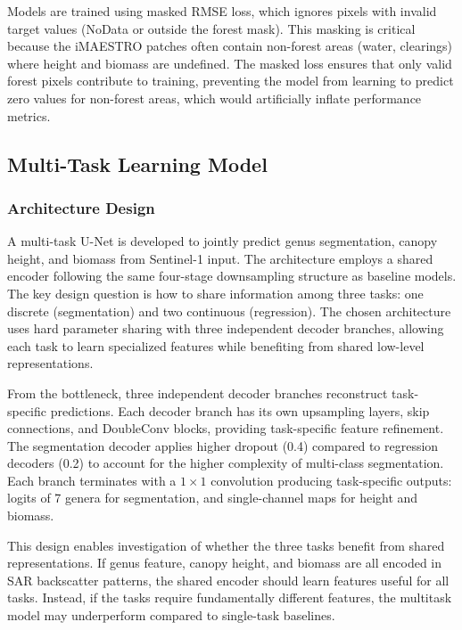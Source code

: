 Models are trained using masked RMSE loss, which ignores pixels with invalid target values (NoData or outside the forest mask). This masking is critical because the iMAESTRO patches often contain non-forest areas (water, clearings) where height and biomass are undefined. The masked loss ensures that only valid forest pixels contribute to training, preventing the model from learning to predict zero values for non-forest areas, which would artificially inflate performance metrics.

\subsection{Multi-Task Learning Model}

\subsubsection{Architecture Design}

A multi-task U-Net is developed to jointly predict genus segmentation, canopy height, and biomass from Sentinel-1 input. The architecture employs a shared encoder following the same four-stage downsampling structure as baseline models. The key design question is how to share information among three tasks: one discrete (segmentation) and two continuous (regression). The chosen architecture uses hard parameter sharing with three independent decoder branches, allowing each task to learn specialized features while benefiting from shared low-level representations.

From the bottleneck, three independent decoder branches reconstruct task-specific predictions. Each decoder branch has its own upsampling layers, skip connections, and DoubleConv blocks, providing task-specific feature refinement. The segmentation decoder applies higher dropout (0.4) compared to regression decoders (0.2) to account for the higher complexity of multi-class segmentation. Each branch terminates with a $1\times 1$ convolution producing task-specific outputs: logits of 7 genera for segmentation, and single-channel maps for height and biomass.

This design enables investigation of whether the three tasks benefit from shared representations. If genus feature, canopy height, and biomass are all encoded in SAR backscatter patterns, the shared encoder should learn features useful for all tasks. Instead, if the tasks require fundamentally different features, the multitask model may underperform compared to single-task baselines.

